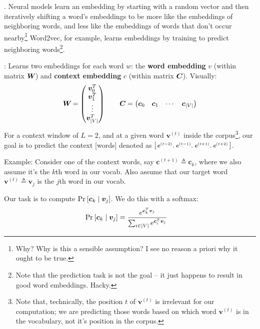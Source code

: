 \documentclass[11pt]{article}
\renewcommand\vec[2][]{\bm{#2}_{#1}}
\newcommand\myspace[1][]{\vspace{#1\bigskipamount}}
\newcommand\p{\Needspace{10\baselineskip} \noindent}
\begin{document}
\myspace{}
\p {}. Neural models learn an embedding by starting with a random vector and then iteratively shifting a word's embeddings to be more like the embeddings of neighboring words, and less like the embeddings of words that don't occur nearby\footnote{Why? Why is this a sensible assumption? I see no reason a priori why it ought to be true.} Word2vec, for example, learns embeddings by training to predict neighboring words\footnote{Note that the prediction task is not the goal -- it just happens to result in good word embeddings. Hacky.}.
\begin{compactitem}
	\item {}: Learns two embeddings for each word $w$: the \textbf{word embedding} $v$ (within matrix $\bm{W}_{}$) and \textbf{context embedding} $c$ (within matrix $\bm{C}_{}$). Visually:
	\begin{align}
	\matr{W} = \begin{pmatrix} \vec[0]{v}^T \\ \vec[1]{v}^T \\ \vdots \\ \vec[|V|]{v}^T \end{pmatrix} 
	\qquad
	\matr{C} = \begin{pmatrix} \vec[0]{c} & \vec[1]{c} & \cdots & \vec[|V|]{c}   \end{pmatrix} 
	\end{align}
	For a context window of $L = 2$, and at a given word $\vec{v}^{(t)}$ inside the corpus\footnote{Note that, technically, the position $t$ of $\vec{v}^{(t)}$ is irrelevant for our computation; we are predicting those words based on which word $\vec{v}^{(t)}$ is in the vocabulary, not it's position in the corpus.}, our goal is to predict the context [words] denoted as $\begin{bsmallmatrix} \vec{c}^{(t - 2)}, & \vec{c}^{(t - 1)}, & \vec{c}^{(t + 1)}, & \vec{c}^{(t + 2)} \end{bsmallmatrix}$. 
	\begin{compactitem}
		\item Example: Consider one of the context words, say $\vec{c}^{(t + 1)} \triangleq \vec[k]{c}$, where we also assume it's the $k$th word in our vocab. Also assume that our target word $\vec{v}^{(t)} \triangleq \vec[j]{v}$ is the $j$th word in our vocab. 
		
		\item Our task is to compute $\Prob{\vec[k]{c} \mid \vec[j]{v}}$. We do this with a softmax:
		\begin{align}
			\Prob{\vec[k]{c} \mid \vec[j]{v}} &= \frac{  e^{ \vec[k]{c}^T \vec[j]{v} } }{  \sum_{i \in |V|} e^{\vec[i]{c}^T \vec[j]{v}}   }
		\end{align}
	\end{compactitem}
	

\end{compactitem}
\end{document}
